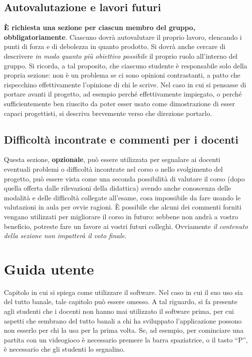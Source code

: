 \documentclass[a4paper,12pt]{report}
\begin{document}
\section{Autovalutazione e lavori futuri}

\textbf{È richiesta una sezione per ciascun membro del gruppo, obbligatoriamente}.
%
Ciascuno dovrà autovalutare il proprio lavoro, elencando i punti di forza e di debolezza in quanto prodotto.
Si dovrà anche cercare di descrivere \emph{in modo quanto più obiettivo possibile} il proprio ruolo all'interno del gruppo.
Si ricorda, a tal proposito, che ciascuno studente è responsabile solo della propria sezione: non è un problema se ci sono opinioni contrastanti, a patto che rispecchino effettivamente l'opinione di chi le scrive.
Nel caso in cui si pensasse di portare avanti il progetto, ad esempio perché effettivamente impiegato, o perché sufficientemente ben riuscito da poter esser usato come dimostrazione di esser capaci progettisti, si descriva brevemente verso che direzione portarlo.

\section{Difficoltà incontrate e commenti per i docenti}

Questa sezione, \textbf{opzionale}, può essere utilizzata per segnalare ai docenti eventuali problemi o difficoltà incontrate nel corso o nello svolgimento del progetto, può essere vista come una seconda possibilità di valutare il corso (dopo quella offerta dalle rilevazioni della didattica) avendo anche conoscenza delle modalità e delle difficoltà collegate all'esame, cosa impossibile da fare usando le valutazioni in aula per ovvie ragioni.
%
È possibile che alcuni dei commenti forniti vengano utilizzati per migliorare il corso in futuro: sebbene non andrà a vostro beneficio, potreste fare un favore ai vostri futuri colleghi.
%
Ovviamente \textit{il contenuto della sezione non impatterà il voto finale}.

\appendix
\chapter{Guida utente}

Capitolo in cui si spiega come utilizzare il software. Nel caso in cui il suo uso sia del tutto 
banale, tale capitolo può essere omesso.
%
A tal riguardo, si fa presente agli studenti che i docenti non hanno mai utilizzato il software 
prima, per cui aspetti che sembrano del tutto banali a chi ha sviluppato l'applicazione possono non 
esserlo per chi la usa per la prima volta.
%
Se, ad esempio, per cominciare una partita con un videogioco è necessario premere la barra 
spaziatrice, o il tasto ``P'', è necessario che gli studenti lo segnalino.
\end{document}
